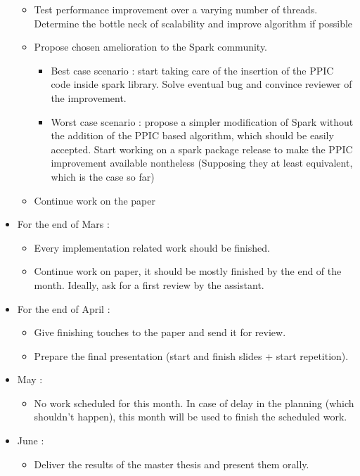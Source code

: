 \documentclass[10pt]{article}
\begin{document}
\begin{itemize}
	\begin{itemize}
	\item Test performance improvement over a varying number of threads. Determine the bottle neck of scalability and improve algorithm if possible

	\item Propose chosen amelioration to the Spark community. 

		\begin{itemize}
		\item Best case scenario : start taking care of the insertion of the PPIC code inside spark library. Solve eventual bug and convince reviewer of the improvement.

		\item Worst case scenario : propose a simpler modification of Spark without the addition of the PPIC based algorithm, which should be easily accepted.
Start working on a spark package release to make the PPIC improvement available nontheless (Supposing they at least equivalent, which is the case so far)
		\end{itemize}

	\item Continue work on the paper
	\end{itemize}

\item  For the end of Mars :

	\begin{itemize}
	\item Every implementation related work should be finished.

	\item Continue work on paper, it should be mostly finished by the end of the month.
Ideally, ask for a first review by the assistant.
	\end{itemize}

\item For the end of April :
	\begin{itemize}
	\item  Give finishing touches to the paper and send it for review.

	\item Prepare the final presentation (start and finish slides + start repetition).
	\end{itemize}

\item May :

	\begin{itemize}
	\item  No work scheduled for this month. In case of delay in the planning (which shouldn't happen), this month will be used to finish the scheduled work.
	\end{itemize}

\item June :

	\begin{itemize}
	\item Deliver the results of the master thesis and present them orally.
	\end{itemize}

\end{itemize}
\end{document}
